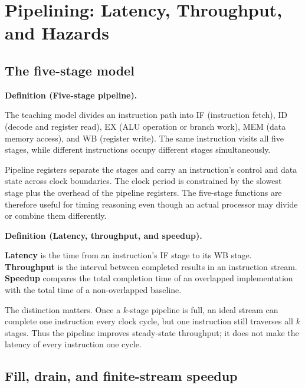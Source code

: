\documentclass[11pt]{article}
\newenvironment{definitionbox}[1]{%
  \par\noindent\textbf{Definition (#1).}\ \itshape
}{\par\vspace{0.3em}}
\begin{document}
\section{Pipelining: Latency, Throughput, and Hazards}
\label{sec:pipeline}

\subsection{The five-stage model}

\begin{definitionbox}{Five-stage pipeline}
The teaching model divides an instruction path into IF (instruction fetch), ID
(decode and register read), EX (ALU operation or branch work), MEM (data memory
access), and WB (register write). The same instruction visits all five stages,
while different instructions occupy different stages simultaneously.
\end{definitionbox}

Pipeline registers separate the stages and carry an instruction's control and
data state across clock boundaries. The clock period is constrained by the
slowest stage plus the overhead of the pipeline registers. The five-stage
functions are therefore useful for timing reasoning even though an actual
processor may divide or combine them differently.

\begin{definitionbox}{Latency, throughput, and speedup}
\textbf{Latency} is the time from an instruction's IF stage to its WB stage.
\textbf{Throughput} is the interval between completed results in an instruction
stream. \textbf{Speedup} compares the total completion time of an overlapped
implementation with the total time of a non-overlapped baseline.
\end{definitionbox}

The distinction matters. Once a $k$-stage pipeline is full, an ideal stream
can complete one instruction every clock cycle, but one instruction still
traverses all $k$ stages. Thus the pipeline improves steady-state throughput;
it does not make the latency of every instruction one cycle.

\subsection{Fill, drain, and finite-stream speedup}
\end{document}
